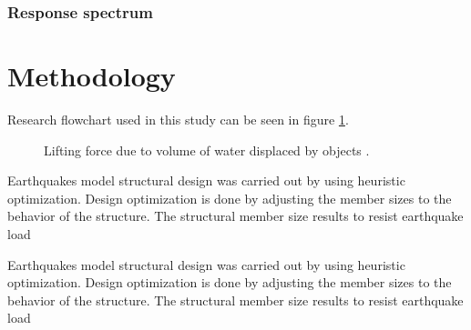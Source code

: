 \documentclass{cup-pan}
\begin{document}
\subsubsection{Response spectrum}
\label{subsub: appresponsespectrum}

\section{Methodology}
\label{sec:method}

Research flowchart used in this study can be seen in figure \ref{fig: flowchart}.

\begin{figure}
\centering
{}

\caption{Lifting force due to volume of water displaced by objects \citep{leet}.}
\label{fig: flowchart}
\end{figure}


Earthquakes model structural design was carried out by using heuristic optimization. Design optimization is done by adjusting the member sizes to the behavior of the structure. The structural member size results to resist earthquake load

Earthquakes model structural design was carried out by using heuristic optimization. Design optimization is done by adjusting the member sizes to the behavior of the structure. The structural member size results to resist earthquake load
\end{document}
